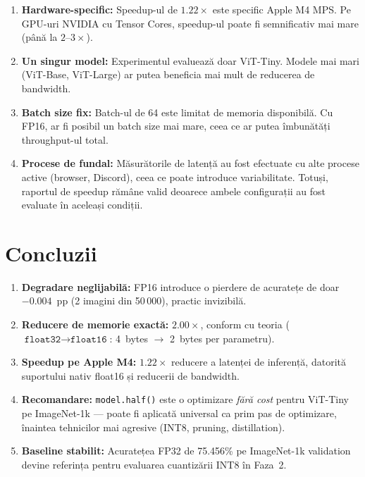 \documentclass[12pt,a4paper]{article}
\begin{document}
\begin{enumerate}
  \item \textbf{Hardware-specific:} Speedup-ul de $1.22\times$ este specific
    Apple M4 MPS. Pe GPU-uri NVIDIA cu Tensor Cores, speedup-ul poate fi
    semnificativ mai mare (până la $2$--$3\times$).
  \item \textbf{Un singur model:} Experimentul evaluează doar ViT-Tiny.
    Modele mai mari (ViT-Base, ViT-Large) ar putea beneficia mai mult
    de reducerea de bandwidth.
  \item \textbf{Batch size fix:} Batch-ul de 64 este limitat de memoria
    disponibilă. Cu FP16, ar fi posibil un batch size mai mare, ceea ce
    ar putea îmbunătăți throughput-ul total.
  \item \textbf{Procese de fundal:} Măsurătorile de latență au fost
    efectuate cu alte procese active (browser, Discord), ceea ce poate
    introduce variabilitate. Totuși, raportul de speedup rămâne valid
    deoarece ambele configurații au fost evaluate în aceleași condiții.
\end{enumerate}

\section{Concluzii}

\begin{enumerate}
  \item \textbf{Degradare neglijabilă:} FP16 introduce o pierdere de
    acuratețe de doar $\mathbf{-0.004}$~pp (2 imagini din 50\,000),
    practic invizibilă.

  \item \textbf{Reducere de memorie exactă:} $\mathbf{2.00\times}$,
    conform cu teoria ($\texttt{float32} \to \texttt{float16}$:
    4~bytes $\to$ 2~bytes per parametru).

  \item \textbf{Speedup pe Apple M4:} $\mathbf{1.22\times}$ reducere
    a latenței de inferență, datorită suportului nativ float16 și
    reducerii de bandwidth.

  \item \textbf{Recomandare:} \texttt{model.half()} este o optimizare
    \emph{fără cost} pentru ViT-Tiny pe ImageNet-1k --- poate fi aplicată
    universal ca prim pas de optimizare, înaintea tehnicilor mai agresive
    (INT8, pruning, distillation).

  \item \textbf{Baseline stabilit:} Acuratețea FP32 de 75.456\% pe
    ImageNet-1k validation devine referința pentru evaluarea cuantizării
    INT8 în Faza~2.
\end{enumerate}
\end{document}
